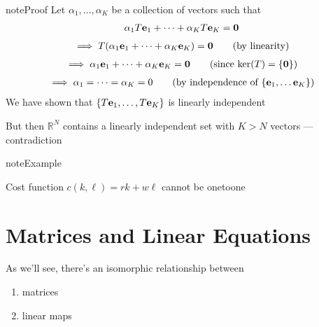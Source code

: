 \documentclass[letterpaper,10pt,english]{jupyterBook}
\begin{document}
\begin{sphinxadmonition}{note}{Proof}
\sphinxAtStartPar
Let \(\alpha_1, \ldots, \alpha_K\) be a collection of vectors such that
\begin{equation*}
\begin{split}
%
\alpha_1 T {\bf e}_1 + \cdots + \alpha_K T {\bf e}_K = {\bf 0}
%
\end{split}
\end{equation*}\begin{equation*}
\begin{split}
%
\implies 
T (\alpha_1 {\bf e}_1 + \cdots + \alpha_K {\bf e}_K) = {\bf 0}
\qquad (\text{by linearity})
%
\end{split}
\end{equation*}\begin{equation*}
\begin{split}
%
\implies
\alpha_1 {\bf e}_1 + \cdots + \alpha_K {\bf e}_K = {\bf 0}
\qquad (\text{since $\ker(T) = \{{\bf 0}\}$})
%
\end{split}
\end{equation*}\begin{equation*}
\begin{split}
%
\implies 
\alpha_1 = \cdots = \alpha_K = 0
\qquad (\text{by independence of $\{{\bf e}_1, \ldots {\bf e}_K\}$)}
%
\end{split}
\end{equation*}
\sphinxAtStartPar
We have shown that \(\{T{\bf e}_1, \ldots, T{\bf e}_K\}\) is linearly
independent

\sphinxAtStartPar
But then \(\mathbb{R}^N\) contains a linearly independent set
with \(K > N\) vectors — contradiction
\end{sphinxadmonition}

\begin{sphinxadmonition}{note}{Example}

\sphinxAtStartPar
Cost function \(c(k, \ell) = rk + w\ell\) cannot be one\sphinxhyphen{}to\sphinxhyphen{}one
\end{sphinxadmonition}

\begin{figure}[htbp]
\centering

\noindent{}
\end{figure}


\section{Matrices and Linear Equations}
\label{\detokenize{05.linear_algebra:matrices-and-linear-equations}}
\sphinxAtStartPar
As we’ll see, there’s an isomorphic relationship between
\begin{enumerate}
%
\item {} 
\sphinxAtStartPar
matrices

\item {} 
\sphinxAtStartPar
linear maps

\end{enumerate}
\end{document}
